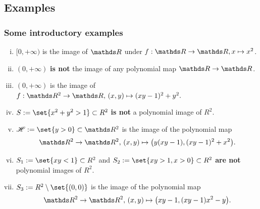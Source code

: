 \documentclass{beamer}
\begin{document}
\subsection{Examples}
\begin{frame}
\frametitle{Some introductory examples}
\begin{enumerate}[(i)]
\item $[0,+\infty)$ is the image of $\R$ under $f:\R\to\R, x\mapsto x^2$.  
\vspace{0.3cm}

\item $(0,+\infty)$ \textbf{is not} the image of any polynomial map $\R\to\R$.   
\vspace{0.3cm}

\item $(0,+\infty)$ is the image of $f:\R^2\to\R,\, (x,y)\mapsto (xy-1)^2+y^2.$    
\vspace{0.3cm}

\item $S:=\set{x^2+y^2>1}\subset R^2$ \textbf{is not} a polynomial image of $R^2$.  
\vspace{0.3cm}

\item $\H:=\set{y>0}\subset\R^2$ is the image of the polynomial map $$\R^2\to\R^2,\, (x,y)\mapsto \big(y(xy-1),(xy-1)^2+x^2\big).$$  
\vspace{-0.4cm}

\item $S_1:=\set{xy<1}\subset R^2$ and $S_2:=\set{xy>1,x>0}\subset R^2$ \textbf{are not} polynomial images of $R^2$.  
\vspace{0.3cm}

\item $S_3:=R^2\setminus\set{(0,0)}$ is the image of the polynomial map $$\R^2\to\R^2,\, (x,y)\mapsto \big(xy-1,(xy-1)x^2-y\big).$$

\end{enumerate}
\end{frame}
\end{document}
